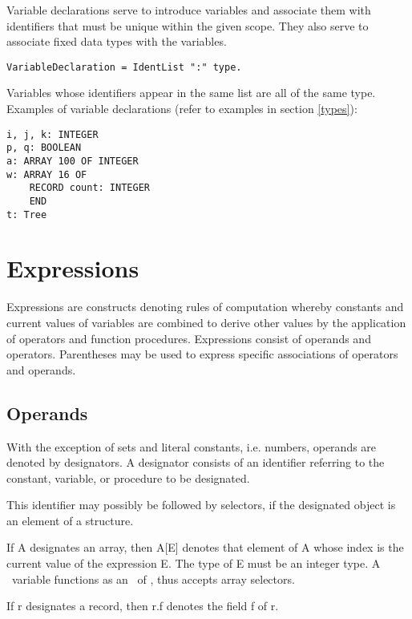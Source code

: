 \documentclass[12pt]{article}
\begin{document}
Variable declarations serve to introduce variables and associate them with identifiers that must be unique within the given scope. They also serve to associate fixed data types with the variables.

\begin{lstlisting}[style=ebnf]
VariableDeclaration = IdentList ":" type.
\end{lstlisting}

Variables whose identifiers appear in the same list are all of the same type. Examples of variable declarations (refer to examples in section \ref{types}):

\begin{lstlisting}[style=example]
i, j, k: INTEGER
p, q: BOOLEAN
a: ARRAY 100 OF INTEGER
w: ARRAY 16 OF
    RECORD count: INTEGER
    END
t: Tree
\end{lstlisting}

\section{Expressions}

Expressions are constructs denoting rules of computation whereby constants and current values of variables are combined to derive other values by the application of operators and function procedures. Expressions consist of operands and operators. Parentheses may be used to express specific associations of operators and operands.

\subsection{Operands}
\label{operands}

With the exception of sets and literal constants, i.e. numbers, operands are denoted by designators. A designator consists of an identifier referring to the constant, variable, or procedure to be designated. 

This identifier may possibly be followed by selectors, if the designated object is an element of a structure.

If A designates an array, then A[E] denotes that element of A whose index is the current value of the expression E. The type of E must be an integer type. A \STRING\ variable functions as an \ARRAY\ of \CHAR, thus accepts array selectors.

If r designates a record, then r.f denotes the field f of r.
\end{document}
